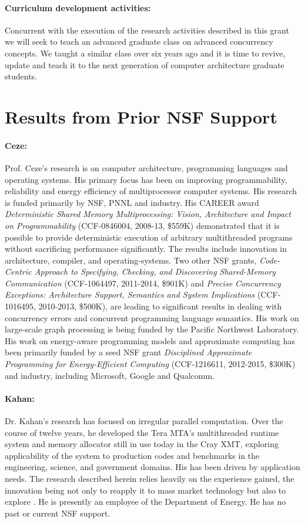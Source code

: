 \paragraph{Curriculum development activities:} Concurrent with the execution of the research activities described in this grant we will seek to teach an advanced graduate class on advanced concurrency concepts.  We taught a similar class over six years ago and it is time to revive, update and teach it to the next generation of computer architecture graduate students.  


\section{Results from Prior NSF Support}

\paragraph{Ceze:} Prof. Ceze's research is on computer architecture, programming languages and operating systems. His primary focus has been on improving programmability, reliability and energy efficiency of multiprocessor computer systems. His research is funded primarily by NSF, PNNL and industry. His CAREER award {\em Deterministic Shared Memory Multiprocessing: Vision, Architecture and Impact on Programmability} (CCF-0846004, 2008-13, \$559K) demonstrated that it is possible to provide deterministic execution of arbitrary multithreaded programs without sacrificing performance significantly. The results include innovation in architecture, compiler, and operating-systems. Two other NSF grants, {\em Code-Centric Approach to Specifying, Checking, and Discovering Shared-Memory Communication} (CCF-1064497, 2011-2014, \$901K) and {\em Precise Concurrency Exceptions: Architecture Support, Semantics and System Implications} (CCF-1016495, 2010-2013, \$500K), are leading to significant results in dealing with concurrency errors and concurrent programming language semantics. His work on large-scale graph processing is being funded by the Pacific Northwest Laboratory. His work on energy-aware programming models and approximate computing has been primarily funded by a seed NSF grant {\em Disciplined Approximate Programming for Energy-Efficient Computing} (CCF-1216611, 2012-2015, \$300K) and industry, including Microsoft, Google and Qualcomm.

\paragraph{Kahan:} Dr. Kahan's research has focused on irregular parallel computation.  Over the course of twelve years, he developed the Tera MTA's multithreaded runtime system and memory allocator still in use today in the Cray XMT, exploring applicability of the system to production codes and benchmarks in the engineering, science, and government domains.  His has been driven by application needs.  The research described herein relies heavily on the experience gained, the innovation being not only to reapply it to mass market technology but also to explore .  He is presently an employee of the Department of Energy.  He has no past or current NSF support.

